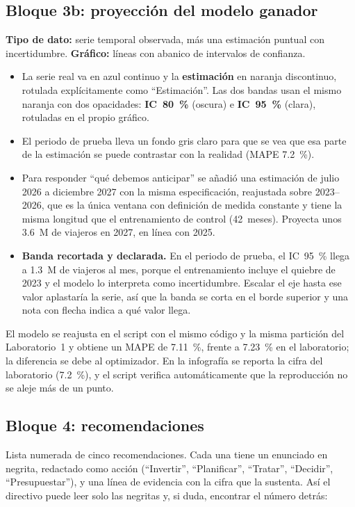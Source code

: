 \documentclass[12pt,letterpaper]{article}
\begin{document}
\subsection{Bloque 3b: proyección del modelo ganador}

\textbf{Tipo de dato:} serie temporal observada, más una estimación puntual con incertidumbre.
\textbf{Gráfico:} líneas con abanico de intervalos de confianza.

\begin{itemize}[leftmargin=1.4em,itemsep=2pt]
  \item La serie real va en azul continuo y la \textbf{estimación} en naranja discontinuo, rotulada
  explícitamente como ``Estimación''. Las dos bandas usan el mismo naranja con dos opacidades:
  \textbf{IC~80~\%} (oscura) e \textbf{IC~95~\%} (clara), rotuladas en el propio gráfico.
  \item El periodo de prueba lleva un fondo gris claro para que se vea que esa parte de la
  estimación se puede contrastar con la realidad (MAPE 7.2~\%).
  \item Para responder ``qué debemos anticipar'' se añadió una estimación de julio 2026 a
  diciembre 2027 con la misma especificación, reajustada sobre 2023--2026, que es la única ventana
  con definición de medida constante y tiene la misma longitud que el entrenamiento de control
  (42~meses). Proyecta unos 3.6~M de viajeros en 2027, en línea con 2025.
  \item \textbf{Banda recortada y declarada.} En el periodo de prueba, el IC~95~\% llega a 1.3~M
  de viajeros al mes, porque el entrenamiento incluye el quiebre de 2023 y el modelo lo interpreta
  como incertidumbre. Escalar el eje hasta ese valor aplastaría la serie, así que la banda se corta
  en el borde superior y una nota con flecha indica a qué valor llega.
\end{itemize}

El modelo se reajusta en el script con el mismo código y la misma partición del Laboratorio~1 y
obtiene un MAPE de 7.11~\%, frente a 7.23~\% en el laboratorio; la diferencia se debe al
optimizador. En la infografía se reporta la cifra del laboratorio (7.2~\%), y el script verifica
automáticamente que la reproducción no se aleje más de un punto.

\subsection{Bloque 4: recomendaciones}

Lista numerada de cinco recomendaciones. Cada una tiene un enunciado en negrita, redactado como
acción (``Invertir'', ``Planificar'', ``Tratar'', ``Decidir'', ``Presupuestar''), y una línea de
evidencia con la cifra que la sustenta. Así el directivo puede leer solo las negritas y, si duda,
encontrar el número detrás:
\end{document}
